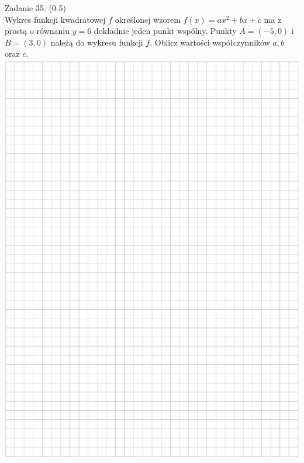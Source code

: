 \documentclass[10pt]{article}
\begin{document}
Zadanie 35. (0-5)\\
Wykres funkcji kwadratowej \(f\) określonej wzorem \(f(x)=a x^{2}+b x+c\) ma z prostą o równaniu \(y=6\) dokładnie jeden punkt wspólny. Punkty \(A=(-5,0)\) i \(B=(3,0)\) należą do wykresu funkcji \(f\). Oblicz wartości współczynników \(a, b\) oraz \(c\).\\
\includegraphics[max width=\textwidth, center]{2024_11_21_465acd0c12fa3e05e8a7g-22}\\
\end{document}
